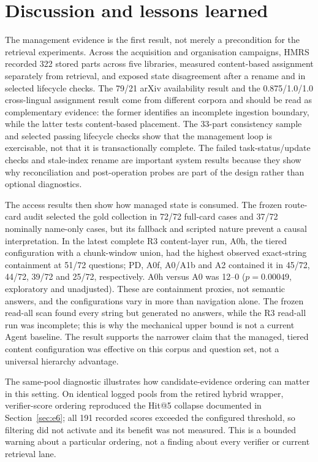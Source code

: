 \section{Discussion and lessons learned}
\label{sec:discussion}

The management evidence is the first result, not merely a precondition for the
retrieval experiments. Across the acquisition and organisation campaigns, HMRS
recorded 322 stored parts across five libraries, measured content-based
assignment separately from retrieval, and exposed state disagreement after a
rename and in selected lifecycle checks. The 79/21 arXiv availability result
and the 0.875/1.0/1.0 cross-lingual assignment result come from different
corpora and should be read as complementary evidence: the former identifies an
incomplete ingestion boundary, while the latter tests content-based placement.
The 33-part consistency sample and selected passing lifecycle checks show
that the management loop is exercisable, not that it is transactionally
complete. The failed task-status/update checks and stale-index rename are
important system results because they show why reconciliation and post-operation
probes are part of the design rather than optional diagnostics.

The access results then show how managed state is consumed. The frozen route-card
audit selected the gold collection in 72/72 full-card cases and 37/72 nominally
name-only cases, but its fallback and scripted nature prevent a causal
interpretation. In the latest complete R3 content-layer run, A0h, the tiered
configuration with a chunk-window union, had the highest observed exact-string
containment at 51/72 questions; PD, A0f, A0/A1b and A2 contained it in
45/72, 44/72, 39/72 and 25/72, respectively. A0h versus A0 was 12--0
($p=0.00049$, exploratory and unadjusted). These are containment proxies, not
semantic answers, and the configurations vary in more than navigation alone.
The frozen read-all scan found every string but generated no answers, while the
R3 read-all run was incomplete; this is why the mechanical upper bound is not a
current Agent baseline. The result supports the narrower claim that the
managed, tiered content configuration was effective on this corpus and question
set, not a universal hierarchy advantage.

The same-pool diagnostic illustrates how candidate-evidence ordering can matter
in this setting. On identical logged pools from the retired hybrid wrapper,
verifier-score ordering reproduced the Hit@5 collapse documented in
Section~\ref{sec:e6}; all 191 recorded scores exceeded the configured
threshold, so filtering did not activate and its benefit was not measured.
This is a bounded warning about a particular ordering, not a finding about
every verifier or current retrieval lane.

